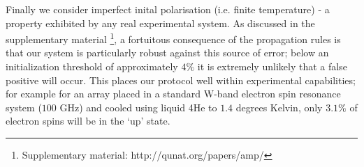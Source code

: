 
Finally we consider imperfect inital polarisation (i.e. finite temperature) - a property exhibited by any real experimental system. As discussed in the supplementary material \footnote{Supplementary material: http://qunat.org/papers/amp/}, a fortuitous consequence of the propagation rules is that our system is particularly robust against this source of error; below an initialization threshold of approximately $4\%$ it is extremely unlikely that a false positive will occur. This places our protocol well within experimental capabilities; for example for an array placed in a standard W-band electron spin resonance system ($100$ GHz) and cooled using liquid 4He to $1.4$ degrees Kelvin, only $3.1\%$ of electron spins will be in the `up' state.


